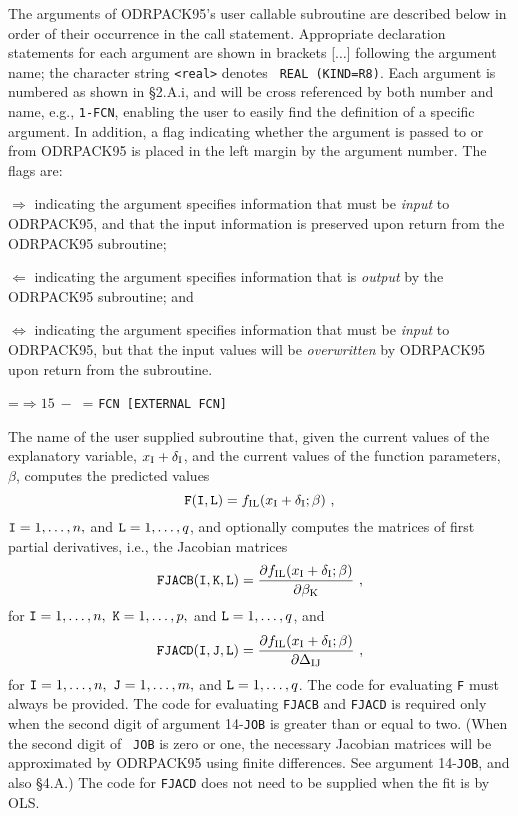 \medskip
\noindent The arguments of ODRPACK95's user callable subroutine are described
below in order of their occurrence in the call statement. Appropriate
declaration statements for each argument are shown in brackets [$\ldots$]
following the argument name; the character string {\tt <real>} denotes {\tt
REAL (KIND=R8)}. Each argument is
numbered as shown in \S 2.A.i, and will be cross referenced by both number and
name, e.g., {\tt 1-FCN}, enabling the user to easily find the definition of a
specific argument. In addition, a flag indicating whether the argument is passed
to or from ODRPACK95 is placed in the left margin by the argument number. The flags are:
\item{$\Longrightarrow$} indicating the argument specifies information that must
be {\it input} to ODRPACK95, and that the input information is preserved upon
return from the ODRPACK95 subroutine;
\item{$\Longleftarrow$} indicating the argument specifies information that is
{\it output} by the ODRPACK95 subroutine; and 
\item{$\Longleftrightarrow$} indicating the argument specifies information that
must be {\it input} to ODRPACK95, but that the input values will be {\it
overwritten} by ODRPACK95 upon return from the subroutine.

\vfil\eject

\setbox\mybox=\hbox{$\Longrightarrow15\ -\ $}
\hangindent=\wd\mybox{} {\tt FCN [EXTERNAL FCN]}

\aligntobox The name of the user supplied subroutine that, given the current values of the explanatory variable, $x_{\rm I}+\delta_{\rm I}$, and the current values of the function parameters, $\beta$, computes the predicted values
$${\tt F(I,L)}=f_{\rm IL}(x_{\rm I}+\delta_{\rm I};\beta)\ ,$$
${\tt I}=1,\ldots,n,$ and ${\tt L}=1,\ldots,q$, and optionally computes the matrices of first partial derivatives, i.e., the Jacobian matrices
$${\tt FJACB(I,K,L)}={{\partial f_{\rm IL}(x_{\rm I}+\delta_{\rm
I};\beta)}\over{\partial\beta_{\rm K}}}\ ,$$
for ${\tt I}=1,\ldots,n,\ {\tt K}=1,\ldots,p,$ and ${\tt L} =1,\ldots,q$, and
$${\tt FJACD(I,J,L)}={{\partial f_{\rm IL}(x_{\rm I}+\delta_{\rm I};\beta)}\over{\partial\Delta_{\rm IJ}}}\ ,$$
for ${\tt I}=1,\ldots,n,\ {\tt J}=1,\ldots,m,$ and ${\tt L}=1,\ldots,q$. The
code for evaluating {\tt F} must always be provided. The code for evaluating
{\tt FJACB} and {\tt FJACD} is required only when the second digit of argument
14-{\tt JOB} is greater than or equal to two. (When the second digit of {\tt
JOB} is zero or one, the necessary Jacobian matrices will be approximated by
ODRPACK95 using finite differences. See argument 14-{\tt JOB}, and also \S 4.A.) The code for {\tt FJACD} does not need to be supplied when the fit is by OLS. 

